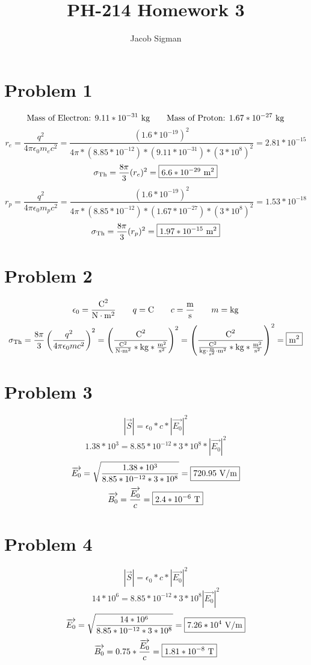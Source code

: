 \documentclass{article}
\title{PH-214 Homework 3}
\author{Jacob Sigman}
\date{}
\begin{document}
\maketitle
\section*{Problem 1}
\[\textnormal{Mass of Electron: }9.11*10^{-31}\textnormal{ kg}\hspace{7 mm}\textnormal{Mass of Proton: }1.67*10^{-27}\textnormal{ kg}\]
\[r_e=\frac{q^2}{4\pi\epsilon_0m_ec^2}=\frac{(1.6*10^{-19})^2}{4\pi*(8.85*10^{-12})*(9.11*10^{-31})*(3*10^8)^2}=2.81*10^{-15}\]
\[\sigma_\textnormal{Th}=\frac{8\pi}{3}(r_e)^2=\boxed{6.6*10^{-29}\textnormal{ m}^2}\]
\[r_p=\frac{q^2}{4\pi\epsilon_0m_pc^2}=\frac{(1.6*10^{-19})^2}{4\pi*(8.85*10^{-12})*(1.67*10^{-27})*(3*10^8)^2}=1.53*10^{-18}\]
\[\sigma_\textnormal{Th}=\frac{8\pi}{3}(r_p)^2=\boxed{1.97*10^{-15}\textnormal{ m}^2}\]
\section*{Problem 2}
\[\epsilon_0=\frac{\textnormal{C}^2}{\textnormal{N}\cdot\textnormal{m}^2}\hspace{7 mm}q=\textnormal{C}\hspace{7 mm}c=\frac{\textnormal{m}}{\textnormal{s}}\hspace{7 mm}m=\textnormal{kg}\]
\[\sigma_{\textnormal{Th}}=\frac{8\pi}{3}\left(\frac{q^2}{4\pi\epsilon_0mc^2}\right)^2=\left(\frac{\textnormal{C}^2}{\frac{\textnormal{C}^2}{\textnormal{N}\cdot\textnormal{m}^2}*\textnormal{kg}*\frac{\textnormal{m}^2}{\textnormal{s}^2}}\right)^2=\left(\frac{\textnormal{C}^2}{\frac{\textnormal{C}^2}{\textnormal{kg}\cdot\frac{\textnormal{m}}{\textnormal{s}^2}\cdot\textnormal{m}^2}*\textnormal{kg}*\frac{\textnormal{m}^2}{\textnormal{s}^2}}\right)^2=\boxed{\textnormal{m}^2}\]
\section*{Problem 3}
\[\left|\overrightarrow{S}\right|=\epsilon_0*c*\left|\overrightarrow{E_0}\right|^2\]
\[1.38*10^3=8.85*10^{-12}*3*10^8*\left|\overrightarrow{E_0}\right|^2\]
\[\overrightarrow{E_0}=\sqrt{\frac{1.38*10^3}{8.85*10^{-12}*3*10^8}}=\boxed{720.95\textnormal{ V/m}}\]
\[\overrightarrow{B_0}=\frac{\overrightarrow{E_0}}{c}=\boxed{2.4*10^{-6}\textnormal{ T}}\]
\section*{Problem 4}
\[\left|\overrightarrow{S}\right|=\epsilon_0*c*\left|\overrightarrow{E_0}\right|^2\]
\[14*10^6=8.85*10^{-12}*3*10^{8}\left|\overrightarrow{E_0}\right|^2\]
\[\overrightarrow{E_0}=\sqrt{\frac{14*10^6}{8.85*10^{-12}*3*10^8}}=\boxed{7.26*10^4 \textnormal{ V/m}}\]
\[\overrightarrow{B_0}=0.75*\frac{\overrightarrow{E_0}}{c}=\boxed{1.81*10^{-8}\textnormal{ T}}\]
\end{document}
